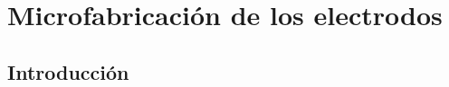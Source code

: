  \newcommand{\NoBiblioMicro}[1]{
 \ifthenelse{\equal{#1}{verdadero}}{}{}
 \NoBiblioMicro{verdadero}}

 
 \FormatoCapituloDosLineas
 
 \chapter{Microfabricación de los electrodos}\label{chap:Microfabricacion}

 \thispagestyle{empty}
	
 
 
 \vfill
 \minitoc
 \newpage

\section{Introducción}
	
